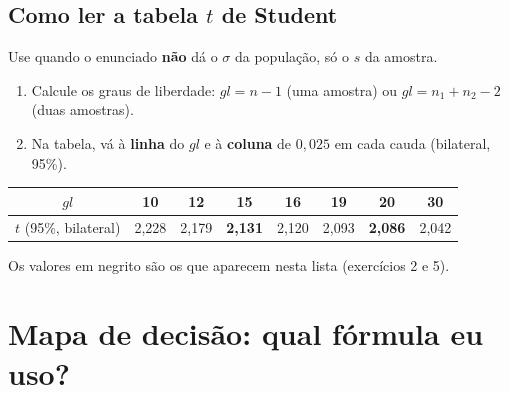 \documentclass[12pt,a4paper]{article}
\begin{document}
\subsection*{Como ler a tabela $t$ de Student}
Use quando o enunciado \textbf{não} dá o $\sigma$ da população, só o $s$ da amostra.
\begin{enumerate}[leftmargin=*,itemsep=1pt]
  \item Calcule os graus de liberdade: $gl = n - 1$ (uma amostra) ou $gl = n_1 + n_2 - 2$ (duas amostras).
  \item Na tabela, vá à \textbf{linha} do $gl$ e à \textbf{coluna} de $0,025$ em cada cauda (bilateral, 95\%).
\end{enumerate}

\begin{center}
\begin{tabular}{c|ccccccc}
\toprule
$gl$ & 10 & 12 & 15 & 16 & 19 & 20 & 30 \\
\midrule
$t$ (95\%, bilateral) & 2,228 & 2,179 & \textbf{2,131} & 2,120 & 2,093 & \textbf{2,086} & 2,042 \\
\bottomrule
\end{tabular}
\end{center}
{\small Os valores em negrito são os que aparecem nesta lista (exercícios 2 e 5).}

\newpage
\section*{Mapa de decisão: qual fórmula eu uso?}\label{mapa}
\end{document}
